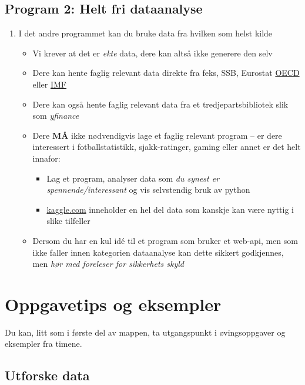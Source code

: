 \documentclass[12pt, titlepage]{article}
\begin{document}
\subsection*{Program 2: Helt fri dataanalyse}
\begin{enumerate}[$\bullet$]
   \item {I det andre programmet kan du bruke data fra hvilken som helst kilde}
   \begin{itemize}
      \item {Vi krever at det er \textit{ekte} data, dere kan altså ikke generere den selv}
      \item {Dere kan hente faglig relevant data direkte fra feks, SSB, Eurostat \href{https://data-explorer.oecd.org/}{OECD} eller \href{https://www.imf.org/en/Data}{IMF}}
      \item {Dere kan også hente faglig relevant data fra et tredjepartsbibliotek slik som \textit{yfinance}}
      \item {Dere \textbf{MÅ} ikke nødvendigvis lage et faglig relevant program -- er dere interessert i fotballstatistikk, sjakk-ratinger, gaming eller annet er det helt innafor:}
         \begin{itemize}
            \item {Lag et program, analyser data som \textit{du synest er spennende/interessant} og vis selvstendig bruk av python}
            \item {\href{www.kaggle.com}{kaggle.com} inneholder en hel del data som kanskje kan være nyttig i slike tilfeller}
         \end{itemize}
      \item {Dersom du har en kul idé til et program som bruker et web-api, men som ikke faller innen kategorien dataanalyse kan dette sikkert godkjennes, men \textit{hør med foreleser for sikkerhets skyld}}
   \end{itemize}
\end{enumerate}


\section*{Oppgavetips og eksempler}

Du kan, litt som i første del av mappen, ta utgangspunkt i øvingsoppgaver og eksempler fra timene.

\subsection*{Utforske data}
\end{document}

